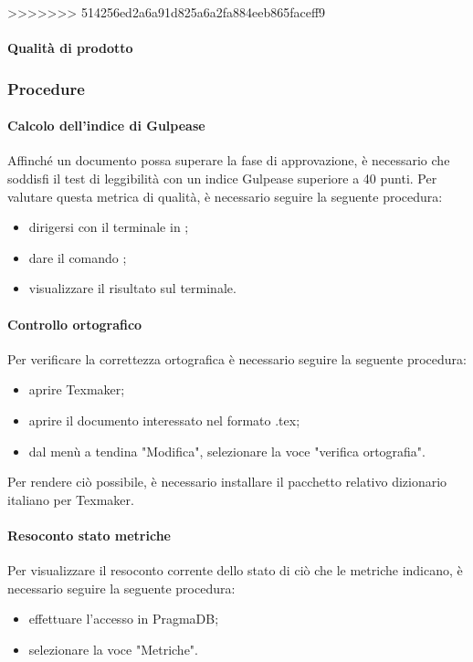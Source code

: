 >>>>>>> 514256ed2a6a91d825a6a2fa884eeb865faceff9
\paragraph{Qualità di prodotto}
\subsubsection{Procedure}

\paragraph{Calcolo dell'indice di Gulpease}
Affinché un documento possa superare la fase di approvazione, è necessario che soddisfi il test di
leggibilità con un indice Gulpease superiore a 40 punti. Per valutare questa metrica di qualità, è necessario seguire la seguente procedura:
\begin{itemize}
	\item dirigersi con il terminale in \GulScript;
	\item dare il comando ;
    \item visualizzare il risultato sul terminale.
\end{itemize}
\paragraph{Controllo ortografico}
Per verificare la correttezza ortografica è necessario seguire la seguente procedura:
\begin{itemize}
	\item aprire Texmaker;
	\item aprire il documento interessato nel formato .tex;
	\item dal menù a tendina "Modifica", selezionare la voce "verifica ortografia".
\end{itemize}
Per rendere ciò possibile, è necessario installare il pacchetto relativo dizionario italiano per Texmaker.
\paragraph{Resoconto stato metriche}
Per visualizzare il resoconto corrente dello stato di ciò che le metriche indicano, è necessario seguire la seguente procedura:
\begin{itemize}
	\item effettuare l'accesso in PragmaDB;
	\item selezionare la voce "Metriche".
\end{itemize}
